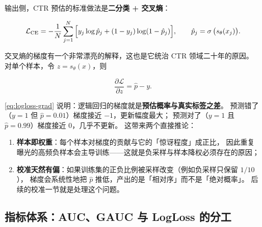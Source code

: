 输出侧，CTR 预估的标准做法是\textbf{二分类 + 交叉熵}：

\begin{equation}
\mathcal{L}_{\mathrm{CE}} = -\frac{1}{N}\sum_{j=1}^{N}\Big[ y_j \log \hat{p}_j + (1 - y_j)\log(1 - \hat{p}_j) \Big],
\qquad \hat{p}_j = \operatorname{\sigma}\big(s_\theta(x_j)\big).
\label{eq:logloss}
\end{equation}

交叉熵的梯度有一个非常漂亮的解释，这也是它统治 CTR 领域二十年的原因。
对单个样本，令 $z = s_\theta(x)$，则

\begin{equation}
\frac{\partial \mathcal{L}}{\partial z} = \hat{p} - y .
\label{eq:logloss-grad}
\end{equation}

\begin{insight}[交叉熵梯度 $=$ 预估误差]
\cref{eq:logloss-grad} 说明：逻辑回归的梯度就是\textbf{预估概率与真实标签之差}。
预测错了（$y=1$ 但 $\hat{p}=0.01$）梯度接近 $-1$，更新幅度最大；
预测对了（$y=1$ 且 $\hat{p}=0.99$）梯度接近 $0$，几乎不更新。
这带来两个直接推论：
\begin{enumerate}
  \item \textbf{样本即权重}：每个样本对梯度的贡献与它的「惊讶程度」成正比，
        因此重复曝光的高频负样本会主导训练——这就是负采样与样本降权必须存在的原因；
  \item \textbf{校准天然有偏}：如果训练集的正负比例被采样改变（例如负采样只保留 $1/10$），
        梯度会系统性地把 $\hat{p}$ 推低，产出的是「相对序」而不是「绝对概率」。
        后续的校准一节就是处理这个问题。
\end{enumerate}
\end{insight}

\subsection{指标体系：AUC、GAUC 与 LogLoss 的分工}

